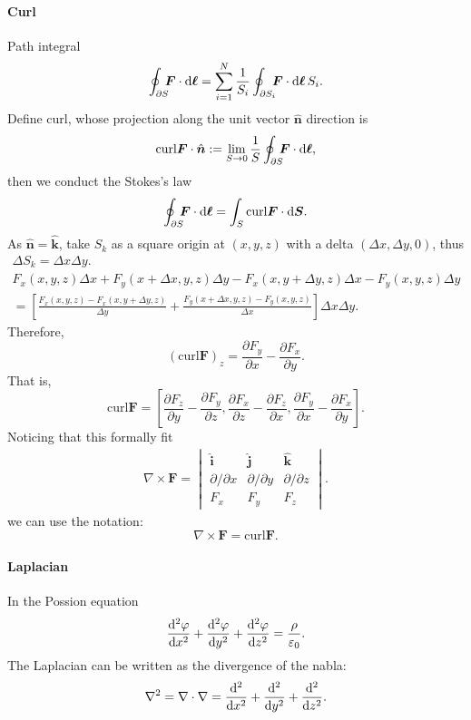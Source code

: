 \documentclass{article}
\def\d{{\rm d}}
\newcommand{\ko}[1]{\hspace{-#1 pt}}%
\newcommand{\sds}[2]{\frac{\d^2 #1}{\d #2^2}}
\newcommand{\pd}[2]{\frac{\partial #1}{\partial #2}}%
\newcommand{\kh}[1]{\left(#1\right)}
\newcommand{\fkh}[1]{\left[#1\right]}
\begin{document}
\paragraph{Curl} Path integral
$$\oint_{\partial S}\ko5\bm F\cdot\d\bm\ell=\sum_{i=1}^N\frac1{S_i}\oint_{\partial S_i}\ko5\bm F\cdot\d\bm\ell\,S_i.$$
Define curl, whose projection along the unit vector $\hat{\bm n}$ direction is
$$\text{curl}\bm F\cdot\hat{\bm n}:=\lim_{S\to0}\frac1S\oint_{\partial S}\ko5\bm F\cdot\d\bm\ell,$$
then we conduct the Stokes's law
$$\oint_{\partial S}\ko5\bm F\cdot\d\bm\ell=\int_S\text{curl}\bm F\cdot\d\bm S.$$
As $\hat{\bm n}=\hat{\bm k}$, take $S_k$ as a square origin at $(x,y,z)$ with a delta $(\Delta x,\Delta y,0)$, thus
\begin{gather*}
	\Delta S_k=\Delta x\Delta y.\\
	F_x(x,y,z)\Delta x+F_y(x+\Delta x,y,z)\Delta y-F_x(x,y+\Delta y,z)\Delta x-F_y(x,y,z)\Delta y\\
	=\fkh{\frac{F_x(x,y,z)-F_x(x,y+\Delta y,z)}{\Delta y}+\frac{F_y(x+\Delta x,y,z)-F_y(x,y,z)}{\Delta x}}\Delta x\Delta y.
\end{gather*}
Therefore,
$$\kh{\text{curl}\bm F}_z=\pd{F_y}x-\pd{F_x}y.$$
That is,
$$\text{curl}\bm F=\fkh{\pd{F_z}y-\pd{F_y}z,\pd{F_x}z-\pd{F_z}x,\pd{F_y}x-\pd{F_x}y}.$$
Noticing that this formally fit
\begin{align*}
	\nabla\times\bm F=
	\begin{vmatrix}
		\hat{\bm i}         & \hat{\bm j}         & \hat{\bm k}         \\
		\partial/\partial x & \partial/\partial y & \partial/\partial z \\
		F_x                 & F_y                 & F_z
	\end{vmatrix}.
\end{align*}
we can use the notation:
$$\nabla\times\bm F=\text{curl}\bm F.$$
\paragraph{Laplacian}In the Possion equation
$$\sds{\varphi}x+\sds{\varphi}y+\sds{\varphi}z=\frac\rho{\varepsilon_0}.$$
The Laplacian can be written as the divergence of the nabla:
$$\nabla^2=\nabla\cdot\nabla=\sds{}x+\sds{}y+\sds{}z.$$
\end{document}

